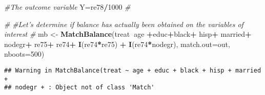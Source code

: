 \documentclass[]{article}
\newenvironment{Shaded}{\begin{snugshade}}{\end{snugshade}}
\newcommand{\CommentTok}[1]{\textcolor[rgb]{0.56,0.35,0.01}{\textit{#1}}}
\newcommand{\DataTypeTok}[1]{\textcolor[rgb]{0.13,0.29,0.53}{#1}}
\newcommand{\DecValTok}[1]{\textcolor[rgb]{0.00,0.00,0.81}{#1}}
\newcommand{\KeywordTok}[1]{\textcolor[rgb]{0.13,0.29,0.53}{\textbf{#1}}}
\newcommand{\NormalTok}[1]{#1}
\newcommand{\OperatorTok}[1]{\textcolor[rgb]{0.81,0.36,0.00}{\textbf{#1}}}
\newcommand{\StringTok}[1]{\textcolor[rgb]{0.31,0.60,0.02}{#1}}
\begin{document}
\begin{Shaded}
\begin{Highlighting}[]
\CommentTok{#The outcome variable}
\NormalTok{Y=re78}\OperatorTok{/}\DecValTok{1000}
\CommentTok{#}


\CommentTok{#}
\CommentTok{#Let's determine if balance has actually been obtained on the variables of interest}
\CommentTok{#}
\NormalTok{mb <-}\StringTok{ }\KeywordTok{MatchBalance}\NormalTok{(treat}\OperatorTok{~}\NormalTok{age }\OperatorTok{+}\NormalTok{educ}\OperatorTok{+}\NormalTok{black}\OperatorTok{+}\StringTok{ }\NormalTok{hisp}\OperatorTok{+}\StringTok{ }\NormalTok{married}\OperatorTok{+}\StringTok{ }\NormalTok{nodegr}\OperatorTok{+}\StringTok{ }\NormalTok{re75}\OperatorTok{+}\StringTok{ }\NormalTok{re74}\OperatorTok{+}\StringTok{ }\KeywordTok{I}\NormalTok{(re74}\OperatorTok{*}\NormalTok{re75) }\OperatorTok{+}\StringTok{ }\KeywordTok{I}\NormalTok{(re74}\OperatorTok{*}\NormalTok{nodegr),}
                   \DataTypeTok{match.out=}\NormalTok{out, }\DataTypeTok{nboots=}\DecValTok{500}\NormalTok{)}
\end{Highlighting}
\end{Shaded}

\begin{verbatim}
## Warning in MatchBalance(treat ~ age + educ + black + hisp + married +
## nodegr + : Object not of class 'Match'
\end{verbatim}
\end{document}
